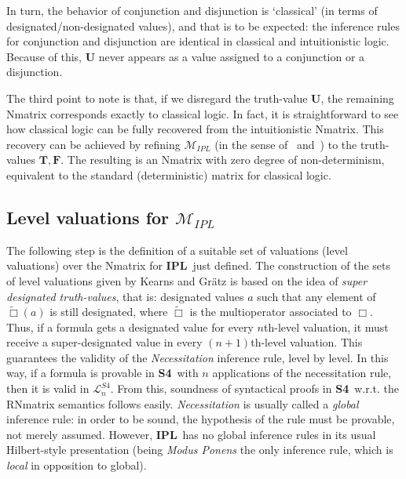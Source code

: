 \documentclass[12pt]{article}
\newcommand{\bT}{\mathbf{T}}
\newcommand{\bU}{\mathbf{U}}
\newcommand{\bF}{\mathbf{F}}
\newcommand{\ipl}{\ensuremath{\mathbf{IPL}}}
\newcommand{\sfo}{\textbf{S4}}
\begin{document}
In turn, the behavior of conjunction and disjunction is `classical' (in terms of designated/non-designated values), and that is to be expected: the inference rules for conjunction and disjunction are identical in classical and intuitionistic logic. Because of this, $\bU$  never appears as a value assigned to a conjunction or a disjunction.

The third point to note is that, if we disregard the truth-value $\bU$, the remaining Nmatrix corresponds exactly to classical logic. In fact, it is straightforward to see how classical logic can be fully recovered from the intuitionistic Nmatrix. This recovery can be achieved by refining $\mathcal{M}_{IPL}$ (in the sense of~\cite{avron2019rexpansions} and~\cite{caleiro2021axioms}) to the truth-values ${\bT, \bF}$. The resulting is an Nmatrix with zero degree of non-determinism, equivalent to the standard (deterministic) matrix for classical logic.


\subsection{Level valuations for $\mathcal{M}_{IPL}$}

The following step is the definition of a suitable set of valuations (level valuations) over the Nmatrix for \ipl\ just defined. The construction of the sets of level valuations given by  Kearns and Gr\"atz is based on the idea of {\em super designated truth-values}, that is: designated values $a$ such that any element of $\tilde{\Box}(a)$ is still designated, where $\tilde{\Box}$ is the multioperator associated to $\Box$. Thus, if a formula gets a designated value for every $n$th-level valuation, it must receive a super-designated value in every $(n+1)$th-level valuation. This guarantees the validity of the {\em Necessitation} inference rule, level by level. In this way, if a formula is provable in \sfo\ with $n$ applications of the necessitation rule, then it is valid in $\mathcal{L}^{S4}_n$. From this, soundness of syntactical proofs in \sfo\ w.r.t. the RNmatrix semantics follows easily. {\em Necessitation} is usually called a {\em global} inference rule: in order to be sound, the hypothesis of the rule must be provable, not merely assumed. However, \ipl\ has no global inference rules in its usual Hilbert-style presentation (being {\em Modus Ponens} the only inference rule, which is {\em local} in opposition to global).
\end{document}
